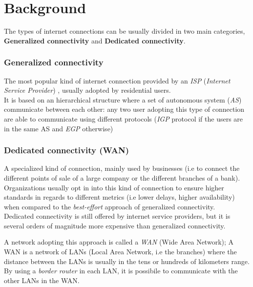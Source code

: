 \section{Background}

The types of internet connections can be usually divided in two main categories, \textbf{Generalized connectivity} and \textbf{Dedicated connectivity}.



\subsubsection{Generalized connectivity}

The most popular kind of internet connection provided by an \textit{ISP} (\textit{Internet Service Provider}) , usually adopted by residential users. \\
It is based on an hierarchical structure where a set of autonomous system (\textit{AS}) communicate between each other: any two user adopting this type of connection are able to communicate using different protocols (\textit{IGP} protocol if the users are in the same AS and  \textit{EGP} otherwise)

\subsubsection{Dedicated connectivity (WAN)}

A specialized kind of connection, mainly used by businesses (i.e to connect the different points of sale of a large company or the different branches of a bank). \\

Organizations usually opt in into this kind of connection to ensure  higher standards in regards to different metrics (i.e lower delays, higher availability) when compared to the \textit{best-effort} approach of generalized connectivity. \\

Dedicated connectivity is still offered by internet service providers, but it is several orders of magnitude more expensive than generalized connectivity.

A network adopting this approach is called a \textit{WAN} (Wide Area Network);
A WAN is a network of LANs (Local Area Network, i.e the branches) where the distance between the LANs is usually in the tens or hundreds of kilometers range. \\
By using a \textit{border router} in each LAN, it is possibile to communicate with the other LANs in the WAN.

